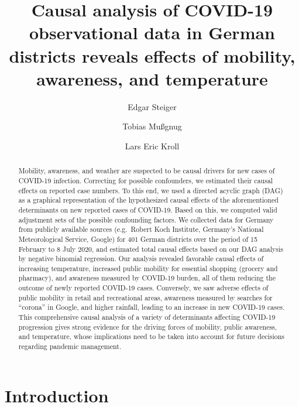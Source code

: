 \documentclass[]{elsarticle} %
\begin{document}
\begin{frontmatter}

  \title{Causal analysis of COVID-19 observational data in German districts
reveals effects of mobility, awareness, and temperature}
    \author[Zi]{Edgar Steiger}
    \author[Zi]{Tobias Mußgnug}
    \author[Zi]{Lars Eric Kroll}
      \address[Zi]{Central Research Institute of Ambulatory Health Care in Germany (Zi),
Salzufer 8, D-10587 Berlin, Germany}
    
  \begin{abstract}
  Mobility, awareness, and weather are suspected to be causal drivers for
  new cases of COVID-19 infection. Correcting for possible confounders, we
  estimated their causal effects on reported case numbers. To this end, we
  used a directed acyclic graph (DAG) as a graphical representation of the
  hypothesized causal effects of the aforementioned determinants on new
  reported cases of COVID-19. Based on this, we computed valid adjustment
  sets of the possible confounding factors. We collected data for Germany
  from publicly available sources (e.g.~Robert Koch Institute, Germany's
  National Meteorological Service, Google) for 401 German districts over
  the period of 15 February to 8 July 2020, and estimated total causal
  effects based on our DAG analysis by negative binomial regression. Our
  analysis revealed favorable causal effects of increasing temperature,
  increased public mobility for essential shopping (grocery and pharmacy),
  and awareness measured by COVID-19 burden, all of them reducing the
  outcome of newly reported COVID-19 cases. Conversely, we saw adverse
  effects of public mobility in retail and recreational areas, awareness
  measured by searches for ``corona'' in Google, and higher rainfall,
  leading to an increase in new COVID-19 cases. This comprehensive causal
  analysis of a variety of determinants affecting COVID-19 progression
  gives strong evidence for the driving forces of mobility, public
  awareness, and temperature, whose implications need to be taken into
  account for future decisions regarding pandemic management.
  \end{abstract}
  
 \end{frontmatter}

\section{Introduction}\label{introduction}
\end{document}
